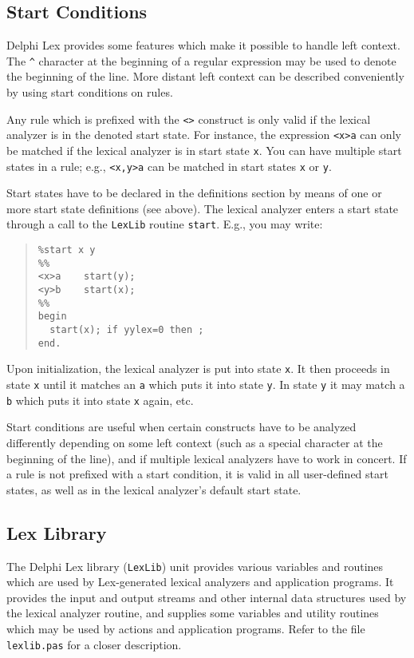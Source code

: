\documentclass[a4paper]{article}
\begin{document}
\subsection{Start Conditions}

Delphi Lex provides some features which make it possible to handle left context.
The \verb"^" character at the beginning of a regular expression may be used
to denote the beginning of the line. More distant left context can be described
conveniently by using start conditions on rules.

Any rule which is prefixed with the \verb"<>" construct is only valid if the
lexical analyzer is in the denoted start state. For instance, the expression
\verb"<x>a" can only be matched if the lexical analyzer is in start state
\verb"x". You can have multiple start states in a rule; e.g., \verb"<x,y>a"
can be matched in start states \verb"x" or \verb"y".

Start states have to be declared in the definitions section by means of
one or more start state definitions (see above). The lexical analyzer enters
a start state through a call to the \verb"LexLib" routine \verb"start". E.g.,
you may write:

\begin{quote}\begin{verbatim}
%start x y
%%
<x>a    start(y);
<y>b    start(x);
%%
begin
  start(x); if yylex=0 then ;
end.
\end{verbatim}\end{quote}

Upon initialization, the lexical analyzer is put into state \verb"x". It then
proceeds in state \verb"x" until it matches an \verb"a" which puts it into
state \verb"y". In state \verb"y" it may match a \verb"b" which puts it into
state \verb"x" again, etc.

Start conditions are useful when certain constructs have to be analyzed
differently depending on some left context (such as a special character
at the beginning of the line), and if multiple lexical analyzers have to
work in concert. If a rule is not prefixed with a start condition, it is
valid in all user-defined start states, as well as in the lexical analyzer's
default start state.

\subsection{Lex Library}

The Delphi Lex library (\verb"LexLib") unit provides various variables and
routines which are used by Lex-generated lexical analyzers and application
programs. It provides the input and output streams and other internal data
structures used by the lexical analyzer routine, and supplies some variables
and utility routines which may be used by actions and application programs.
Refer to the file \verb"lexlib.pas" for a closer description.
\end{document}
